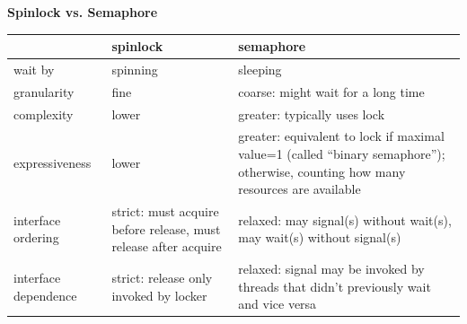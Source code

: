 \documentclass[openany,12pt]{book}
\begin{document}
\begin{samepage}
  \begin{center}
    \textbf{Spinlock vs. Semaphore}
    \begin{tabular}{|>{\raggedright\arraybackslash}p{3cm}|
      >{\raggedright\arraybackslash}p{4cm}|
      >{\raggedright\arraybackslash}p{6cm}|}
      \hline
      \rowcolor{blue!30}
                           & \textbf{spinlock}                                               & \textbf{semaphore}                                                                                                                 \\
      \hline
      wait by              & spinning                                                        & sleeping                                                                                                                           \\
      granularity          & fine                                                            & coarse: might wait for a long time                                                                                                 \\
      complexity           & lower                                                           & greater: typically uses lock                                                                                                       \\
      expressiveness       & lower                                                           & greater: equivalent to lock if maximal value=1 (called ``binary semaphore''); otherwise, counting how many resources are available \\
      interface ordering   & strict: must acquire before release, must release after acquire & relaxed: may signal(s) without wait(s), may wait(s) without signal(s)                                                              \\
      interface dependence & strict: release only invoked by locker                          & relaxed: signal may be invoked by threads that didn't previously wait and vice versa                                               \\
      \hline
    \end{tabular}
  \end{center}
\end{samepage}
\end{document}

